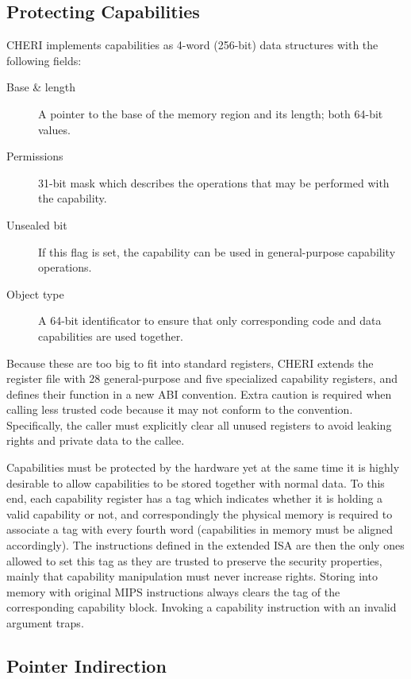 \documentclass[a4paper,12pt,twoside,openright]{report}
\begin{document}
\subsection{Protecting Capabilities}

CHERI implements capabilities as 4-word (256-bit) data structures with the following fields:
\begin{description}
	\item[Base \& length] A pointer to the base of the memory region and its length; both 64-bit values.
	\item[Permissions] 31-bit mask which describes the operations that may be performed with the capability.
	\item[Unsealed bit] If this flag is set, the capability can be used in general-purpose capability operations.
	\item[Object type] A 64-bit identificator to ensure that only corresponding code and data capabilities are used together.
\end{description}

Because these are too big to fit into standard registers, CHERI extends the register file with 28 general-purpose and five specialized capability registers, and defines their function in a new ABI convention. Extra caution is required when calling less trusted code because it may not conform to the convention. Specifically, the caller must explicitly clear all unused registers to avoid leaking rights and private data to the callee.

Capabilities must be protected by the hardware yet at the same time it is highly desirable to allow capabilities to be stored together with normal data. To this end, each capability register has a tag which indicates whether it is holding a valid capability or not, and correspondingly the physical memory is required to associate a tag with every fourth word (capabilities in memory must be aligned accordingly). The instructions defined in the extended ISA are then the only ones allowed to set this tag as they are trusted to preserve the security properties, mainly that capability manipulation must never increase rights. Storing into memory with original MIPS instructions always clears the tag of the corresponding capability block. Invoking a capability instruction with an invalid argument traps.

\subsection{Pointer Indirection}
\end{document}
